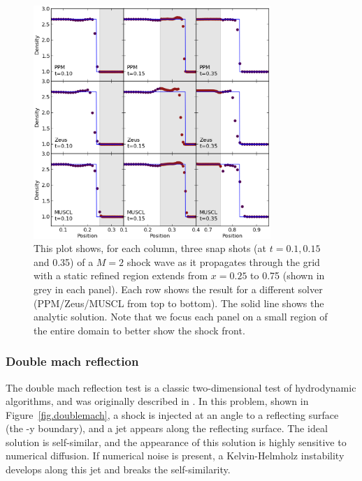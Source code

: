 \begin{figure}
\begin{center}
\includegraphics[width=0.8\textwidth]{figures/ShockPool}
\caption{This plot shows, for each column, three snap shots (at $t=0.1, 0.15$ and 0.35) of a $M=2$ shock wave as it propagates through the grid with a static refined region extends from $x = 0.25$ to 0.75 (shown in grey in each panel).   Each row shows the result for a different solver (PPM/Zeus/MUSCL from top to bottom).  The solid line shows the analytic solution.  Note that we focus each panel on a small region of the entire domain to better show the shock front.}
\label{fig.shockpool}
\end{center}
\end{figure}

\subsubsection{Double mach reflection}
\label{sec.tests.doublemach}

The double mach reflection test is a classic two-dimensional test of
hydrodynamic algorithms, and was originally described in
\citet{1984JCoPh..54..115W} \citep[and more recently
in][]{2008ApJS..178..137S}.  In this problem, shown in
Figure~\ref{fig.doublemach}, a shock is injected at an angle to a
reflecting surface (the -y boundary), and a jet appears along the
reflecting surface.  The ideal solution is self-similar, and the
appearance of this solution is highly sensitive to numerical
diffusion.  If numerical noise is present, a Kelvin-Helmholz
instability develops along this jet and breaks the self-similarity.


